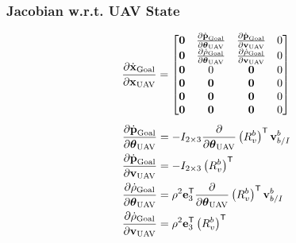 \subsubsection{Jacobian w.r.t. UAV State}
\begin{equation}
  \frac{\partial \dot{\boldsymbol{\mathrm{x}}}_{\text{Goal}}}{\partial \boldsymbol{\mathrm{x}}_{\text{UAV}}}
  =
  \begin{bmatrix}
    \boldsymbol{\mathrm{0}} & \frac{\partial \dot{\boldsymbol{\mathrm{p}}}_{\text{Goal}}}{\partial
      \boldsymbol{\mathrm{\theta}}_{\text{UAV}}} & \frac{\partial
      \dot{\boldsymbol{\mathrm{p}}}_{\text{Goal}}}{\partial \boldsymbol{\mathrm{v}}_{\text{UAV}}} & 0 \\
    \boldsymbol{\mathrm{0}} & \frac{\partial \dot{\rho}_{\text{Goal}}}{\partial
      \boldsymbol{\mathrm{\theta}}_{\text{UAV}}} & \frac{\partial
      \dot{\rho}_{\text{Goal}}}{\partial \boldsymbol{\mathrm{v}}_{\text{UAV}}} & 0 \\
      \boldsymbol{\mathrm{0}} & 0 & \boldsymbol{\mathrm{0}} & 0 \\
    \boldsymbol{\mathrm{0}} & \boldsymbol{\mathrm{0}} & \boldsymbol{\mathrm{0}} & 0 \\
    \boldsymbol{\mathrm{0}} & \boldsymbol{\mathrm{0}} & \boldsymbol{\mathrm{0}} & 0 \\
    \boldsymbol{\mathrm{0}} & \boldsymbol{\mathrm{0}} & \boldsymbol{\mathrm{0}} & 0 \\
  \end{bmatrix}
\end{equation}
\begin{align}
    \frac{\partial \dot{\boldsymbol{\mathrm{p}}}_{\text{Goal}}}{\partial
      \boldsymbol{\mathrm{\theta}}_{\text{UAV}}}
      &=
      - I_{2 \times 3} \frac{\partial}{\partial \boldsymbol{\mathrm{\theta}}_{\text{UAV}}}
      \left(R_{v}^{b}\right)^{\mathsf{T}} \boldsymbol{\mathrm{v}}_{b/I}^{b}
      \\
    \frac{\partial \dot{\boldsymbol{\mathrm{p}}}_{\text{Goal}}}{\partial \boldsymbol{\mathrm{v}}_{\text{UAV}}}
      &=
      - I_{2 \times 3}\left(R_{v}^{b}\right)^{\mathsf{T}}
      \\
    \frac{\partial \dot{\rho}_{\text{Goal}}}{\partial
      \boldsymbol{\mathrm{\theta}}_{\text{UAV}}}
      &=
      \rho^{2} \boldsymbol{\mathrm{e}}_{3}^{\mathsf{T}}
        \frac{\partial}{\partial \boldsymbol{\mathrm{\theta}}_{\text{UAV}}}
        \left(R_{v}^{b}\right)^{\mathsf{T}} \boldsymbol{\mathrm{v}}_{b/I}^{b}
      \\
    \frac{\partial \dot{\rho}_{\text{Goal}}}{\partial \boldsymbol{\mathrm{v}}_{\text{UAV}}}
      &=
      \rho^{2} \boldsymbol{\mathrm{e}}_{3}^{\mathsf{T}} \left(R_{v}^{b}\right)^{\mathsf{T}}
      \\
\end{align}

